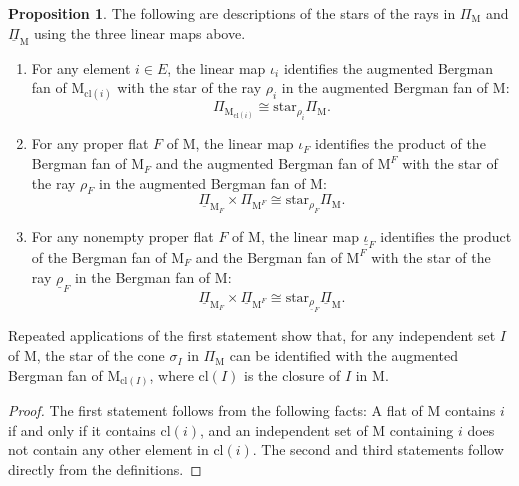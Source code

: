 \documentclass[11pt,reqno]{amsart}
\theoremstyle{definition}
\newtheorem{proposition}[theorem]{Proposition}
\theoremstyle{remark}
\renewcommand{\(}{\left(}
\renewcommand{\)}{\right)}
\newcommand{\<}{\left<}
\renewcommand{\>}{\right>}
\begin{document}
\begin{proposition}\label{PropositionStars}
The following are descriptions of the stars of the rays in $\Pi_\mathrm{M}$ and $\underline{\Pi}_\mathrm{M}$ using the three linear maps above.
\begin{enumerate}[(1)]\itemsep 5pt
\item\label{PropositionStars1} For any element $i\in E$, the linear map $\iota_i$ identifies the augmented Bergman fan of $\mathrm{M}_{\text{cl}(i)}$ with the star of  the ray $\rho_i$ in the augmented Bergman fan of $\mathrm{M}$:
\[
\Pi_{\mathrm{M}_{\text{cl}(i)}} \cong \text{star}_{\rho_i} \Pi_\mathrm{M}.
\]
\item\label{PropositionStars2} For any proper flat $F$ of $\mathrm{M}$, the linear map $\iota_F$ identifies the product of the Bergman fan of $\mathrm{M}_F$ and the augmented Bergman  fan of $\mathrm{M}^F$ with the star of the ray $\rho_F$ in the augmented Bergman fan of $\mathrm{M}$:
\[
\underline{\Pi}_{\mathrm{M}_{F}}\times \Pi_{\mathrm{M}^F} \cong \text{star}_{\rho_F} \Pi_\mathrm{M}.
\]
\item For any nonempty proper flat $F$ of $\mathrm{M}$, the linear map $\underline{\iota}_F$ identifies the product of the Bergman fan of $\mathrm{M}_F$ and the Bergman  fan of $\mathrm{M}^F$ with the star of the ray $\underline{\rho}_F$ in the Bergman fan of $\mathrm{M}$:
\[
\underline{\Pi}_{\mathrm{M}_{F}}\times \underline{\Pi}_{\mathrm{M}^F} \cong \text{star}_{\underline{\rho}_F} \underline{\Pi}_\mathrm{M}.
\]
  \end{enumerate}
\end{proposition}

Repeated applications of the first statement %
show that, for any independent set $I$ of $\mathrm{M}$,
the star of the cone $\sigma_{I}$ in $\Pi_\mathrm{M}$ can be identified with the augmented Bergman fan of $\mathrm{M}_{\text{cl}(I)}$,
where $\text{cl}(I)$ is the closure of $I$ in $\mathrm{M}$.

\begin{proof}
The first statement follows from the following facts: A flat of $\mathrm{M}$ contains $i$ if and only if it contains $\text{cl}(i)$,
and an independent set of $\mathrm{M}$ containing $i$ does not contain any other element in $\text{cl}(i)$.
The second and third statements follow directly from the definitions.
\end{proof}
\end{document}
